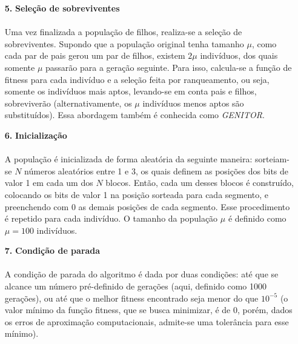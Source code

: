 \documentclass{report}
\begin{document}
\begin{itemize}
	\item[\textbf{5.}] \textbf{Seleção de sobreviventes}
	
	\paragraph{} Uma vez finalizada a população de filhos, realiza-se a seleção de sobreviventes. Supondo que a população original tenha tamanho $\mu$, como cada par de pais gerou um par de filhos, existem $2\mu$ indivíduos, dos quais somente $\mu$ passarão para a geração seguinte. Para isso, calcula-se a função de fitness para cada indivíduo e a seleção feita por ranqueamento, ou seja, somente os indivíduos mais aptos, levando-se em conta pais e filhos, sobreviverão (alternativamente, os $\mu$ indivíduos menos aptos são substituídos). Essa abordagem também é conhecida como \textit{GENITOR}.\\
	
	\item[\textbf{6.}] \textbf{Inicialização}
	
	\paragraph{} A população é inicializada de forma aleatória da seguinte maneira: sorteiam-se $N$ números aleatórios entre 1 e 3, os quais definem as posições dos bits de valor 1 em cada um dos $N$ blocos. Então, cada um desses blocos é construído, colocando os bits de valor 1 na posição sorteada para cada segmento, e preenchendo com 0 as demais posições de cada segmento. Esse procedimento é repetido para cada indivíduo. O tamanho da população $\mu$ é definido como $\mu = 100$ indivíduos.\\
	
	\item[\textbf{7.}] \textbf{Condição de parada}
	
	\paragraph{} A condição de parada do algoritmo é dada por duas condições: até que se alcance um número pré-definido de gerações (aqui, definido como 1000 gerações), ou até que o melhor fitness encontrado seja menor do que $10^{-5}$ (o valor mínimo da função fitness, que se busca minimizar, é de 0, porém, dados os erros de aproximação computacionais, admite-se uma tolerância para esse mínimo).\\
\end{itemize}
\end{document}
